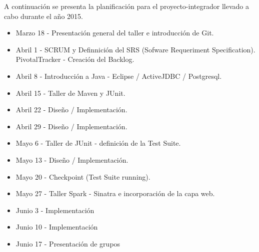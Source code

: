 A continuación se presenta la planificación para el proyecto-integrador
llevado a cabo durante el año 2015.
\begin{itemize}
 \item Marzo 18 - Presentación general del taller e introducción de Git.
\item Abril 1 - SCRUM y Definnición del SRS (Sofware Requeriment Specification). PivotalTracker - Creación del Backlog.
\item Abril 8 - Introducción a Java - Eclipse / ActiveJDBC / Postgresql.
\item Abril 15 - Taller de  Maven y JUnit.
\item Abril 22 - Diseño / Implementación.
\item Abril 29 - Diseño / Implementación.
\item Mayo 6 - Taller de JUnit - definición de la Test Suite.
\item Mayo 13 - Diseño / Implementación.
\item Mayo 20 - Checkpoint (Test Suite running).
\item Mayo 27 - Taller Spark - Sinatra e incorporación de la capa web.
\item Junio 3 - Implementación 
\item Junio 10 - Implementación
\item Junio 17 - Presentación de grupos
\end{itemize}

